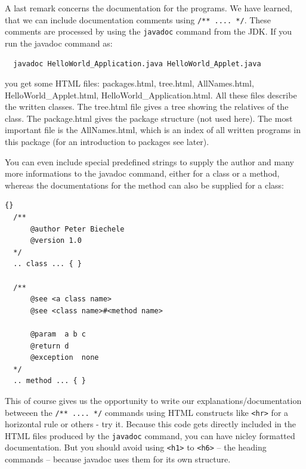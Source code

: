 A last remark concerns the documentation for the programs. We have
learned, that we can include documentation comments using 
\verb|/** .... */|. These comments are processed by using the
\verb|javadoc| command from the JDK. If you run the javadoc command as: 
\begin{verbatim}
  javadoc HelloWorld_Application.java HelloWorld_Applet.java  
\end{verbatim}
you get some HTML files: packages.html, tree.html, AllNames.html,
HelloWorld\_Applet.html, HelloWorld\_Application.html. All these
files describe the written classes. The tree.html file gives a tree
showing the relatives of the class. The package.html gives the
package structure (not used here). The most important file is the
AllNames.html, which is an index of all written programs in this package
(for an introduction to packages see later).

You can even include special predefined strings to supply the
author and many more informations to the javadoc command, either
for a class or a method, whereas the documentations for the method
can also be supplied for a class:
\begin{lstlisting}{}
  /**
      @author Peter Biechele
      @version 1.0
  */
  .. class ... { }

  /** 
      @see <a class name>
      @see <class name>#<method name>

      @param  a b c
      @return d
      @exception  none
  */
  .. method ... { }
\end{lstlisting}

This of course gives us the opportunity to write our 
explanations/documentation
betweeen the \verb|/** .... */| commands using HTML constructs like
\verb|<hr>| for a horizontal rule or others - try it. 
Because this code gets directly included in the HTML files produced by
the \verb|javadoc| command, you can have nicley formatted documentation.
But you should avoid using \verb|<h1>| to \verb|<h6>| -- the heading 
commands -- because javadoc uses them for its own structure.

